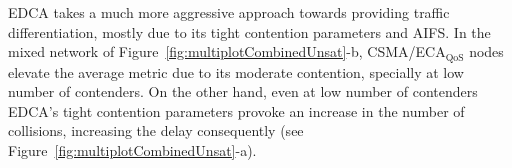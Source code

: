 
EDCA takes a much more aggressive approach towards providing traffic differentiation, mostly due to its tight contention parameters and AIFS. In the mixed network of Figure~\ref{fig:multiplotCombinedUnsat}-b, CSMA/ECA$_{\text{QoS}}$ nodes elevate the average metric due to its moderate contention, specially at low number of contenders. On the other hand, even at low number of contenders EDCA's tight contention parameters provoke an increase in the number of collisions, increasing the delay consequently (see Figure~\ref{fig:multiplotCombinedUnsat}-a).



%
%	
	

